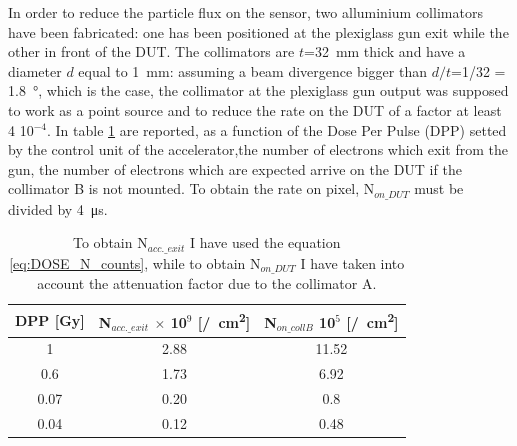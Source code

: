       In order to reduce the particle flux on the sensor, two alluminium collimators have been fabricated: one has been positioned at the plexiglass gun exit while the other in front of the DUT. The collimators are $t$=\SI{32}{mm} thick and have a diameter $d$ equal to \SI{1}{mm}: assuming a beam divergence bigger than $d/t$=1/32 = \SI{1.8}{\degree}, which is the case, the collimator at the plexiglass gun output was supposed to work as a point source and to reduce the rate on the DUT of a factor at least 4 10${^{-4}}$. In table \ref{tab:Dose_N} are reported, as a function of the Dose Per Pulse (DPP) setted by the control unit of the accelerator,the number of electrons which exit from the gun, the number of electrons which are expected arrive on the DUT if the collimator B is not mounted. 
      To obtain the rate on pixel, N$_{on\_DUT}$ must be divided by \SI{4}{\us}.

      \begin{table}
         \begin{center}
         \begin{tabular}{ c |c | c}
         DPP [\si{Gy}] & N$_{acc.\_exit}$ $\times$ 10$^{9}$ [\si{/cm\squared}] & N$_{on\_collB}$ 10$^{5}$ [\si{/cm\squared}]\\
         \hline
         1 & 2.88 & 11.52 \\ 
         0.6 & 1.73 & 6.92 \\
         0.07 & 0.20 & 0.8\\
         0.04 & 0.12 & 0.48\\
         \end{tabular}
         \caption{To obtain N$_{acc.\_exit}$ I have used the equation \ref{eq:DOSE_N_counts}, while to obtain N$_{on\_DUT}$ I have taken into account the attenuation factor due to the collimator A.}
         \label{tab:Dose_N}
         \end{center}
     \end{table}
      

